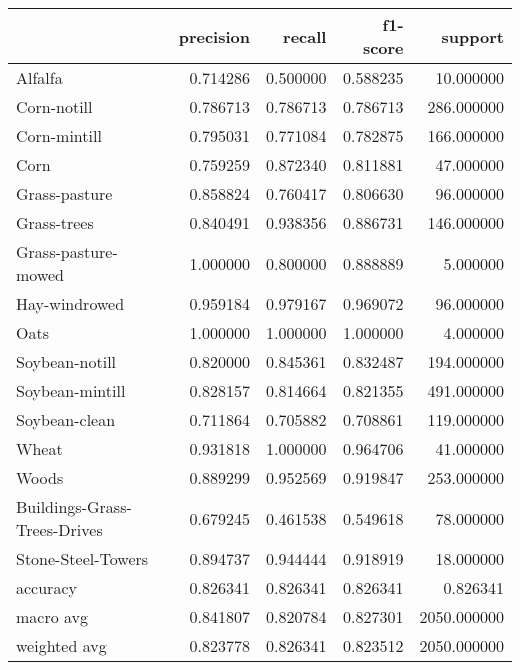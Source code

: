 \begin{tabular}{lrrrr}
\toprule
{} &  precision &    recall &  f1-score &      support \\
\midrule
Alfalfa                      &   0.714286 &  0.500000 &  0.588235 &    10.000000 \\
Corn-notill                  &   0.786713 &  0.786713 &  0.786713 &   286.000000 \\
Corn-mintill                 &   0.795031 &  0.771084 &  0.782875 &   166.000000 \\
Corn                         &   0.759259 &  0.872340 &  0.811881 &    47.000000 \\
Grass-pasture                &   0.858824 &  0.760417 &  0.806630 &    96.000000 \\
Grass-trees                  &   0.840491 &  0.938356 &  0.886731 &   146.000000 \\
Grass-pasture-mowed          &   1.000000 &  0.800000 &  0.888889 &     5.000000 \\
Hay-windrowed                &   0.959184 &  0.979167 &  0.969072 &    96.000000 \\
Oats                         &   1.000000 &  1.000000 &  1.000000 &     4.000000 \\
Soybean-notill               &   0.820000 &  0.845361 &  0.832487 &   194.000000 \\
Soybean-mintill              &   0.828157 &  0.814664 &  0.821355 &   491.000000 \\
Soybean-clean                &   0.711864 &  0.705882 &  0.708861 &   119.000000 \\
Wheat                        &   0.931818 &  1.000000 &  0.964706 &    41.000000 \\
Woods                        &   0.889299 &  0.952569 &  0.919847 &   253.000000 \\
Buildings-Grass-Trees-Drives &   0.679245 &  0.461538 &  0.549618 &    78.000000 \\
Stone-Steel-Towers           &   0.894737 &  0.944444 &  0.918919 &    18.000000 \\
accuracy                     &   0.826341 &  0.826341 &  0.826341 &     0.826341 \\
macro avg                    &   0.841807 &  0.820784 &  0.827301 &  2050.000000 \\
weighted avg                 &   0.823778 &  0.826341 &  0.823512 &  2050.000000 \\
\bottomrule
\end{tabular}

